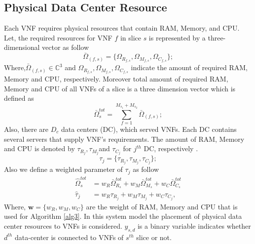 \documentclass[conference]{IEEEtran}
\begin{document}
\subsection{Physical Data Center Resource}
Each VNF requires
physical resources that contain RAM, Memory, and CPU.
Let, the required resources for VNF $f$ in slice $s$ is represented by a three-dimensional vector as follow
\begin{equation}
\bar{\Omega}_{(f,s)} = \{\Omega_{R_{f,s}}, \Omega_{M_{f,s}}, \Omega_{C_{f,s}} \};
\end{equation} 
Where,$\bar{\Omega}_{(f,s)}\in \mathbb{C}^{3}$ and $\Omega_{R_{f,s}}, \Omega_{M_{f,s}}, \Omega_{C_{f,s}}$ indicate the amount of required RAM, Memory and CPU, respectively.
Moreover total amount of required RAM, Memory and CPU of all VNFs of a slice is a three dimension vector which is defined as
\begin{equation}
\bar{\Omega}_{s}^{tot} = \sum_{f=1}^{M_{s_1} + M_{s_2}}\bar{\Omega}_{(f,s)};
\end{equation}
Also, there are $D_c$ data centers (DC), which served VNFs. Each DC contains several servers that supply VNF's requirements.
The amount of RAM, Memory and CPU is denoted by $\tau_{R_{j}}, \tau_{M_{j}}$and $\tau_{C_{j}} $ for $j^{th}$ DC, respectively .
\begin{equation*}
\tau_j = \{\tau_{R_{j}}, \tau_{M_{j}}, \tau_{C_{j}} \};
\end{equation*}
Also we define a weighted parameter of $\tau_j$ as follow
\begin{equation}\label{wt}
\begin{split}
\hat{\Omega}_{s}^{tot} &= w_R \bar{\Omega}_{R_s}^{tot} + w_M \bar{\Omega}_{M_s}^{tot} + w_C \bar{\Omega}_{C_s}^{tot} \\
\hat{\tau}_j &= w_R \tau_{R_{j}} + w_M \tau_{M_{j}} + w_C \tau_{C_{j}},
\end{split}
\end{equation}
Where, $\boldsymbol{w} = \{w_R, w_M, w_C\}$ are the weight of RAM, Memory and CPU that is used for Algorithm \ref{alg3}.
In this system model the placement of physical data center resources to VNFs is considered. $y_{s,d}$ is a binary variable indicates whether $d^{th}$ data-center is connected to VNFs of $s^{th}$ slice or not.
\end{document}
